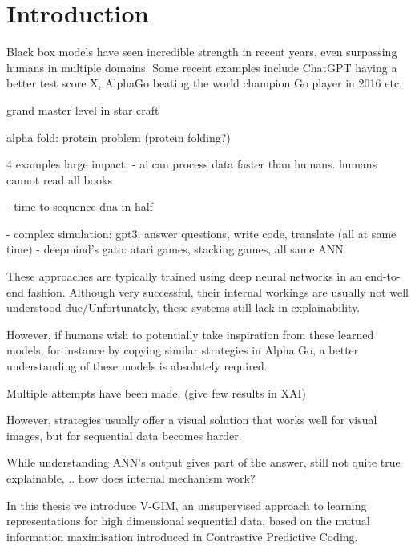 \chapter{Introduction}

\setcounter{page}{1} %


Black box models have seen incredible strength in recent years, even surpassing humans in multiple domains.
Some recent examples include ChatGPT having a better test score X, AlphaGo beating the world champion Go player in 2016 \citep{fuAlphaGoMonteCarlo2016} etc.

grand master level in star craft

alpha fold: protein problem (protein folding?)

4 examples large impact:
 - ai can process data faster than humans. humans cannot read all books
 
 - time to sequence dna in half

 - complex simulation: gpt3: answer questions, write code, translate (all at same time)
 	- deepmind's gato: atari games, stacking games, all same ANN
 	



These approaches are typically trained using deep neural networks in an end-to-end fashion. Although very successful, their internal workings are usually not well understood due/Unfortunately, these systems still lack in explainability.

However, if humans wish to potentially take inspiration from these learned models, for instance by copying similar strategies in Alpha Go, a better understanding of these models is absolutely required.


Multiple attempts have been made, (give few results in XAI)

However, strategies usually offer a visual solution that works well for visual images, but for sequential data becomes harder.

While understanding ANN's output gives part of the answer, still not quite true explainable, .. how does internal mechanism work?
 

In this thesis we introduce V-GIM, an unsupervised approach to learning representations for high dimensional sequential data, based on the mutual information maximisation introduced in Contrastive Predictive Coding.

